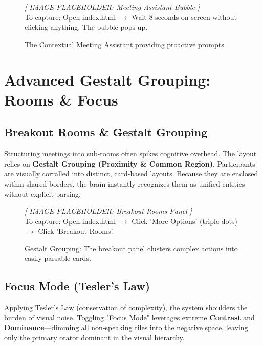 \documentclass[12pt,a4paper]{article}
\begin{document}
\begin{figure}[H]
    \centering
    \begin{tcolorbox}[colback=gray!10,colframe=gray!50,arc=4mm,height=7cm,valign=center,halign=center]
        \large\textit{[ IMAGE PLACEHOLDER: Meeting Assistant Bubble ]}\\[0.5cm]
        \small To capture: Open index.html $\rightarrow$ Wait 8 seconds on screen without clicking anything. The bubble pops up.
    \end{tcolorbox}
    \caption{The Contextual Meeting Assistant providing proactive prompts.}
\end{figure}

\section{Advanced Gestalt Grouping: Rooms \& Focus}

\subsection{Breakout Rooms \& Gestalt Grouping}
Structuring meetings into sub-rooms often spikes cognitive overhead. The layout relies on \textbf{Gestalt Grouping (Proximity \& Common Region)}. Participants are visually corralled into distinct, card-based layouts. Because they are enclosed within shared borders, the brain instantly recognizes them as unified entities without explicit parsing.

\begin{figure}[H]
    \centering
    \begin{tcolorbox}[colback=gray!10,colframe=gray!50,arc=4mm,height=7cm,valign=center,halign=center]
        \large\textit{[ IMAGE PLACEHOLDER: Breakout Rooms Panel ]}\\[0.5cm]
        \small To capture: Open index.html $\rightarrow$ Click 'More Options' (triple dots) $\rightarrow$ Click 'Breakout Rooms'.
    \end{tcolorbox}
    \caption{Gestalt Grouping: The breakout panel clusters complex actions into easily parsable cards.}
\end{figure}

\subsection{Focus Mode (Tesler's Law)}
Applying Tesler's Law (conservation of complexity), the system shoulders the burden of visual noise. Toggling "Focus Mode" leverages extreme \textbf{Contrast} and \textbf{Dominance}—dimming all non-speaking tiles into the negative space, leaving only the primary orator dominant in the visual hierarchy.
\end{document}
